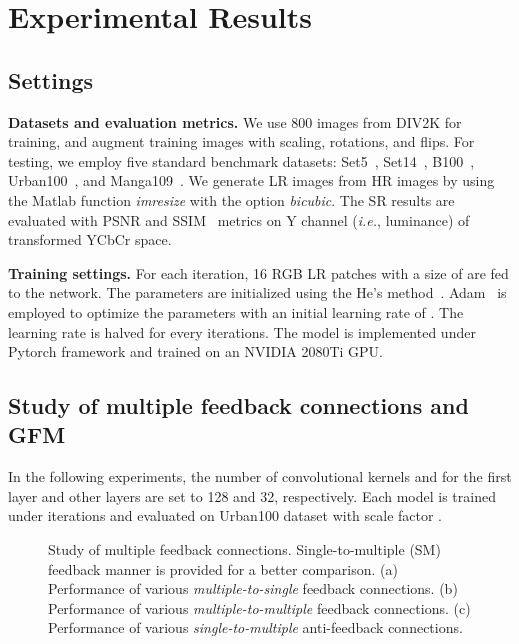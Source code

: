 \documentclass{bmvc2k}
\begin{document}
	\section{Experimental Results}
	
	\subsection{Settings}
	
	\setlength{\parskip}{0.5\baselineskip}
	
	\noindent \textbf{Datasets and evaluation metrics.} We use 800 images from DIV2K for training, and augment training images with scaling, rotations, and flips. For testing, we employ five standard benchmark datasets: Set5~\cite{bevilacqua2012low}, Set14~\cite{zeyde2010single}, B100~\cite{martin2001database}, Urban100~\cite{huang2015single}, and Manga109~\cite{matsui2017sketch}. We generate LR images from HR images by using the Matlab function \textit{imresize} with the option \textit{bicubic}. The SR results are evaluated with PSNR and SSIM~\cite{wang2004image} metrics on Y channel (\textit{i.e.}, luminance) of transformed YCbCr space.
	
	\noindent \textbf{Training settings.} For each iteration, 16 RGB LR patches with a size of  are fed to the network. The parameters are initialized using the He's method~\cite{he2015delving}. Adam~\cite{kingma2014adam} is employed to optimize the parameters with an initial learning rate of . The learning rate is halved for every  iterations. The model is implemented under Pytorch framework and trained on an NVIDIA 2080Ti GPU.
	
	\subsection{Study of multiple feedback connections and GFM}
	\label{sec:sgmc}
	
	In the following experiments, the number of convolutional kernels  and  for the first layer and other layers are set to 128 and 32, respectively. Each model is trained under  iterations and evaluated on Urban100 dataset with scale factor . 
	
	\begin{figure}
		\centering
		\caption{Study of multiple feedback connections. Single-to-multiple (SM) feedback manner is provided for a better comparison. (a) Performance of various \textit{multiple-to-single} feedback connections. (b) Performance of various \textit{multiple-to-multiple} feedback connections. (c) Performance of various \textit{single-to-multiple} anti-feedback connections. }
		\label{fig:sgmfc}
		\vspace{-6mm}
	\end{figure}
	
\end{document}
